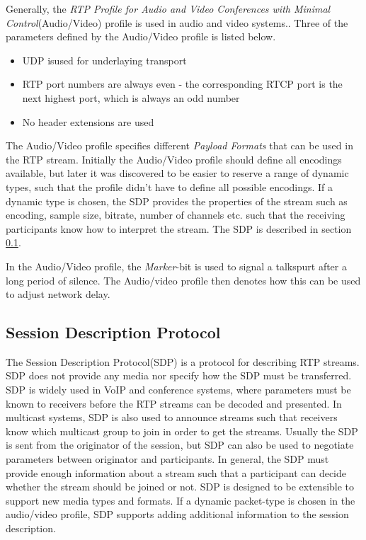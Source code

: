 Generally, the \textit{RTP Profile for Audio and Video Conferences with Minimal Control}\citep{RFC3551}(Audio/Video) profile is used in audio and video systems.\citep{perkins2003rtp}.
Three of the parameters defined by the Audio/Video profile is listed below.
\begin{itemize}
	\item UDP isused for underlaying transport
	\item RTP port numbers are always even - the corresponding RTCP port is the next highest port, which is always an odd number
	\item No header extensions are used
\end{itemize} \citep{johnston2004sip}

The Audio/Video profile specifies different \textit{Payload Formats} that can be used in the RTP stream. Initially the Audio/Video profile should define all encodings available, but later it was discovered to be easier to reserve a range of dynamic types, such that the profile didn't have to define all possible encodings. If a dynamic type is chosen, the SDP provides the properties of the stream such as encoding, sample size, bitrate, number of channels etc. such that the receiving participants know how to interpret the stream.
The SDP is described in section \ref{sec:design:sdp}.

In the Audio/Video profile, the \textit{Marker}-bit is used to signal a talkspurt after a long period of silence. The Audio/video profile then denotes how this can be used to adjust network delay.

\subsection{Session Description Protocol} \label{sec:design:sdp}
The Session Description Protocol(SDP) is a protocol for describing RTP streams.
SDP does not provide any media nor specify how the SDP must be transferred.
SDP is widely used in VoIP and conference systems, where parameters must be known to receivers before the RTP streams can be decoded and presented. In multicast systems, SDP is also used to announce streams such that receivers know which multicast group to join in order to get the streams. Usually the SDP is sent from the originator of the session, but SDP can also be used to negotiate parameters between originator and participants. In general, the SDP must provide enough information about a stream such that a participant can decide whether the stream should be joined or not.  SDP is designed to be extensible to support new media types and formats. If a dynamic packet-type is chosen in the audio/video profile, SDP supports adding additional information to the session description. 

